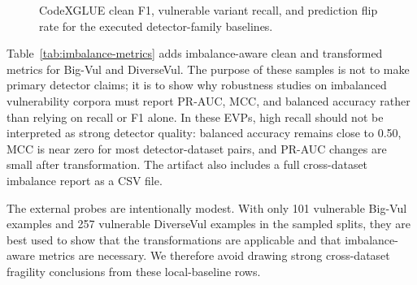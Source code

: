\documentclass[a4paper,fleqn]{cas-dc}
\begin{document}
\begin{figure}[t]
  \centering
  \resizebox{\columnwidth}{!}{}
  \caption{CodeXGLUE clean F1, vulnerable variant recall, and prediction flip rate for the executed detector-family baselines.}
  \label{fig:robustness-summary}
\end{figure}

Table~\ref{tab:imbalance-metrics} adds imbalance-aware clean and transformed
metrics for Big-Vul and DiverseVul. The purpose of these samples is not to make
primary detector claims; it is to show why robustness studies on imbalanced
vulnerability corpora must report PR-AUC, MCC, and balanced accuracy rather
than relying on recall or F1 alone. In these EVPs, high
recall should not be interpreted as strong detector quality: balanced accuracy
remains close to 0.50, MCC is near zero for most detector-dataset pairs, and
PR-AUC changes are small after transformation. The artifact also includes a
full cross-dataset imbalance report as a CSV file.

The external probes are intentionally modest. With only 101 vulnerable Big-Vul
examples and 257 vulnerable DiverseVul examples in the sampled splits, they are
best used to show that the transformations are applicable and that
imbalance-aware metrics are necessary. We therefore avoid drawing strong
cross-dataset fragility conclusions from these local-baseline rows.

\begin{table}[t]
  \centering
  \caption{Imbalance-aware clean and transformed metrics on Big-Vul and DiverseVul.}
  \label{tab:imbalance-metrics}
\end{table}
\end{document}
